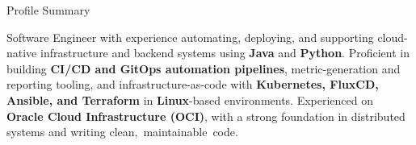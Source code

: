 \documentclass{resume}
\begin{document}
\begin{rSection}{Profile Summary}

Software Engineer with experience automating, deploying, and supporting cloud-native infrastructure and backend systems using \textbf{Java} and \textbf{Python}. Proficient in building \textbf{CI/CD and GitOps automation pipelines}, metric-generation and reporting tooling, and infrastructure-as-code with \textbf{Kubernetes, FluxCD, Ansible, and Terraform} in \textbf{Linux}-based environments. Experienced on \textbf{Oracle Cloud Infrastructure (OCI)}, with a strong foundation in distributed systems and writing clean,~maintainable~code.

\end{rSection}
\end{document}
